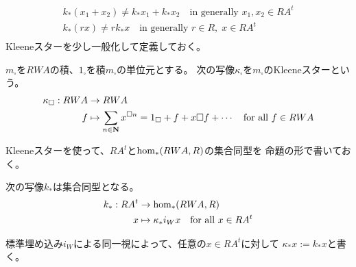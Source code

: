 		\begin{equation*}\begin{split} %
			k_*(x_1+x_2) \neq k_*x_1+ k_*x_2 \quad\text{in generally }x_1,x_2\in RA^t \\
			k_*(rx) \neq rk_*x \quad\text{in generally }r\in R,\;x\in RA^t \\
		\end{split}\end{equation*} %
		Kleeneスターを少し一般化して定義しておく。
		\begin{definition}[Kleeneスター]\label{def:Kleeneスター} %
			$m_\square$を$RWA$の積、$1_\square$を積$m_\square$の単位元とする。
			次の写像$\kappa_\square$を$m_\square$のKleeneスターという。
			\begin{equation*}\begin{split} %
				\kappa_\square: RWA &\to RWA \\
				f &\mapsto \sum_{n\in\mybf{N}}x^{\square n}
					= 1_\square + f + x\square f + \cdots
					\quad\text{for all }f\in RWA
			\end{split}\end{equation*} %
		\end{definition} %
		Kleeneスターを使って、$RA^t$と$\operatorname{hom}_*(RWA,R)$の集合同型を
		命題の形で書いておく。
		\begin{proposition}[群と環の関係]\label{prop:群と環の関係} %
			次の写像$k_*$は集合同型となる。
			\begin{equation*}\begin{split} %
				k_*: RA^t &\to \homset_*(RWA,R) \\
				x &\mapsto \kappa_*i_W x \quad\text{for all }x\in RA^t \\
			\end{split}\end{equation*} %
		\end{proposition} %
		標準埋め込み$i_W$による同一視によって、任意の$x\in RA^t$に対して
		$\kappa_*x:=k_*x$と書く。

